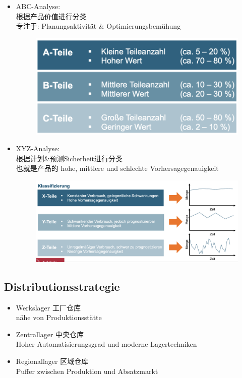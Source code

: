\documentclass[12pt, letterpaper]{article}
\begin{document}
\begin{CJK*}{UTF8}{gbsn}
\begin{itemize}
\newpage
\item ABC-Analyse:\\
根据产品价值进行分类\\ 
专注于: Planungsaktivität \& Optimierungsbemühung

\begin{figure}[h!]
  \centering %
  \includegraphics[width=0.4\linewidth]{VL35.png}\\
\end{figure}

\item XYZ-Analyse:\\
根据计划\&预测Sicherheit进行分类\\
也就是产品的  hohe, mittlere und schlechte Vorhersagegenauigkeit
\begin{figure}[h!]
  \centering %
  \includegraphics[width=0.6\linewidth]{VL36.png}\\
\end{figure}

\end{itemize}

\subsection{Distributionsstrategie}
\begin{itemize}
\item Werkslager 工厂仓库\\ 
nähe von Produktionsstätte

\item Zentrallager 中央仓库\\
Hoher Automatisierungsgrad und moderne Lagertechniken

\item Regionallager 区域仓库\\
Puffer zwischen Produktion und Absatzmarkt


\end{itemize}
\end{CJK*}
\end{document}
